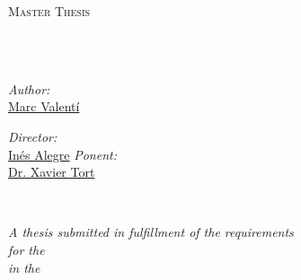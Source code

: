 \documentclass[
12pt, %
english, %
onehalfspacing, %
headsepline, %
]{MastersDoctoralThesis} %
\author{Marc \textsc{Valentí}} %
\begin{document}
\frontmatter %

\pagestyle{plain} %


\begin{titlepage}
\begin{center}

\vspace*{.06\textheight}
{\scshape\LARGE \univname\par}\vspace{1.5cm} %
\textsc{\Large Master Thesis}\\[0.5cm] %

\HRule \\[0.4cm] %
{\huge \bfseries \ttitle\par}\vspace{0.4cm} %
\HRule \\[1.5cm] %
 
\begin{minipage}[t]{0.4\textwidth}
\begin{flushleft} \large
\emph{Author:}\\
\href{http://www.johnsmith.com}{Marc Valentí} %
\end{flushleft}
\end{minipage}
\begin{minipage}[t]{0.4\textwidth}
\begin{flushright} \large
\emph{Director:} \\
\href{http://www.jamessmith.com}{Inés Alegre} %
\newline
\emph{Ponent:} \\
\href{http://www.jamessmith.com}{Dr. Xavier Tort}
\end{flushright}
\end{minipage}\\[3cm]
 
\vfill

\large \textit{A thesis submitted in fulfillment of the requirements\\ for the \degreename}\\[0.3cm] %
\textit{in the}\\[0.4cm]
 
% 
 
\vfill
\end{center}
\end{titlepage}
\end{document}
